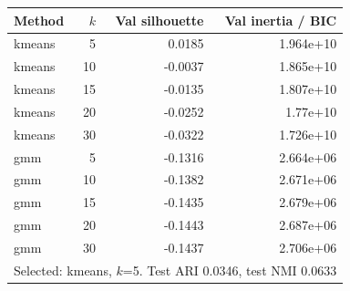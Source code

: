 \begin{tabular}{lrrr}
\toprule
Method & $k$ & Val silhouette & Val inertia / BIC \\
\midrule
kmeans & 5 & 0.0185 & 1.964e+10 \\
kmeans & 10 & -0.0037 & 1.865e+10 \\
kmeans & 15 & -0.0135 & 1.807e+10 \\
kmeans & 20 & -0.0252 & 1.77e+10 \\
kmeans & 30 & -0.0322 & 1.726e+10 \\
gmm & 5 & -0.1316 & 2.664e+06 \\
gmm & 10 & -0.1382 & 2.671e+06 \\
gmm & 15 & -0.1435 & 2.679e+06 \\
gmm & 20 & -0.1443 & 2.687e+06 \\
gmm & 30 & -0.1437 & 2.706e+06 \\
\midrule
\multicolumn{4}{l}{Selected: kmeans, $k$=5. Test ARI 0.0346, test NMI 0.0633} \\
\bottomrule
\end{tabular}
